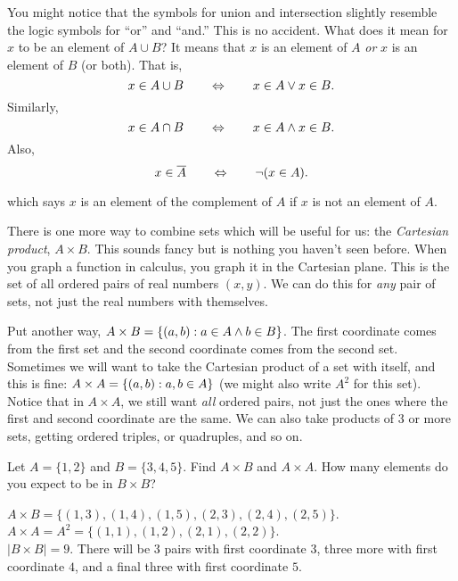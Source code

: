 \documentclass[12pt]{article}
\begin{document}
You might notice that the symbols for union and intersection slightly resemble the logic symbols for ``or'' and ``and.''  This is no accident.  What does it mean for $x$ to be an element of $A\cup B$?  It means that $x$ is an element of $A$ \emph{or} $x$ is an element of $B$ (or both).  That is,
\[x \in A \cup B \qquad \Leftrightarrow \qquad x \in A \vee x \in B.\]
Similarly,
\[x \in A \cap B \qquad \Leftrightarrow \qquad x \in A \wedge x \in B.\]
Also,
\[x \in \overline A \qquad \Leftrightarrow \qquad \neg (x \in  A).\]


which says $x$ is an element of the complement of $A$ if $x$ is not an element of $A$.

There is one more way to combine sets which will be useful for us: the \emph{Cartesian product}, $A \times B$.  This sounds fancy but is nothing you haven't seen before.  When you graph a function in calculus, you graph it in the Cartesian plane.  This is the set of all ordered pairs of real numbers $(x,y)$.  We can do this for \emph{any} pair of sets, not just the real numbers with themselves.

Put another way, $A \times B = \{(a,b) : a \in A \wedge b \in B\}$.  The first coordinate comes from the first set and the second coordinate comes from the second set.  Sometimes we will want to take the Cartesian product of a set with itself, and this is fine: $A \times A = \{(a,b) : a, b \in A\}$ (we might also write $A^2$ for this set).  Notice that in $A \times A$, we still want \emph{all} ordered pairs, not just the ones where the first and second coordinate are the same.  We can also take products of 3 or more sets, getting ordered triples, or quadruples, and so on.

\begin{example}
Let $A = \{1,2\}$ and $B = \{3,4,5\}$.  Find $A \times B$ and $A \times A$.  How many elements do you expect to be in $B \times B$?
\begin{solution}
$A \times B = \{(1,3), (1,4), (1,5), (2,3), (2,4), (2,5)\}$.  \\ $A \times A = A^2 = \{(1,1), (1,2), (2,1), (2,2)\}$. \\
$|B\times B| = 9$.  There will be 3 pairs with first coordinate $3$, three more with first coordinate $4$, and a final three with first coordinate $5$.
\end{solution}
\end{example}
%
%
\end{document}
